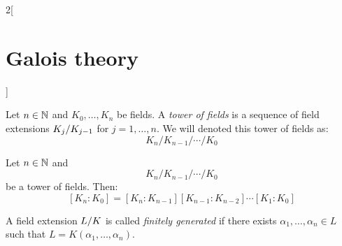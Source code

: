 \documentclass[../../../main.tex]{subfiles}
\begin{document}
\begin{multicols}{2}[\section{Galois theory}]
\begin{prop}
  \end{prop}
  \begin{definition}
    Let $n\in\mathbb{N}$ and $K_0,\ldots,K_n$ be fields. A \textit{tower of fields} is a sequence of field extensions $\quot{K_j}{K_{j-1}}$ for $j=1,\ldots,n$. We will denoted this tower of fields as: $$K_n/K_{n-1}/\cdots/K_0$$
  \end{definition}
  \begin{corollary}
    Let $n\in\mathbb{N}$ and $$K_n/K_{n-1}/\cdots/K_0$$ be a tower of fields. Then: $$[K_n:K_0]=[K_n:K_{n-1}][K_{n-1}:K_{n-2}]\cdots[K_1:K_0]$$
  \end{corollary}
  \begin{definition}
    A field extension $\quot{L}{K}$ is called \textit{finitely generated} if there exists $\alpha_1,\ldots,\alpha_n\in L$ such that $L=K(\alpha_1,\ldots,\alpha_n)$.
  \end{definition}

\end{multicols}
\end{document}
